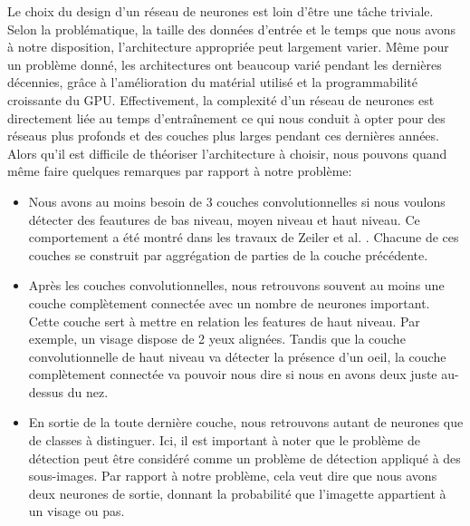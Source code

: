\documentclass[a4paper,11pt]{article}
\begin{document}
    Le choix du design d'un réseau de neurones est loin d'être une tâche triviale.
    Selon la problématique, la taille des données d'entrée et le temps que nous avons à notre disposition, l'architecture appropriée peut largement varier.
    Même pour un problème donné, les architectures ont beaucoup varié pendant les dernières décennies, grâce à l'amélioration du matérial utilisé et la programmabilité croissante du GPU.
    Effectivement, la complexité d'un réseau de neurones est directement liée au temps d'entraînement ce qui nous conduit à opter pour des réseaus plus profonds et des couches plus larges pendant ces dernières années.
    \\
    Alors qu'il est difficile de théoriser l'architecture à choisir, nous pouvons quand même faire quelques remarques par rapport à notre problème:
    \begin{itemize}
        \item
            Nous avons au moins besoin de 3 couches convolutionnelles si nous voulons détecter des feautures de bas niveau, moyen niveau et haut niveau.
            Ce comportement a été montré dans les travaux de Zeiler et al. \cite{zeiler2014visualizing}.
            Chacune de ces couches se construit par aggrégation de parties de la couche précédente.
        \item
            Après les couches convolutionnelles, nous retrouvons souvent au moins une couche complètement connectée avec un nombre de neurones important.
            Cette couche sert à mettre en relation les features de haut niveau. 
            Par exemple, un visage dispose de 2 yeux alignées.
            Tandis que la couche convolutionnelle de haut niveau va détecter la présence d'un oeil, la couche complètement connectée va pouvoir nous dire si nous en avons deux juste au-dessus du nez.
        \item
            En sortie de la toute dernière couche, nous retrouvons autant de neurones que de classes à distinguer.
            Ici, il est important à noter que le problème de détection peut être considéré comme un problème de détection appliqué à des sous-images.
            Par rapport à notre problème, cela veut dire que nous avons deux neurones de sortie, donnant la probabilité que l'imagette appartient à un visage ou pas.
    \end{itemize}
\end{document}
